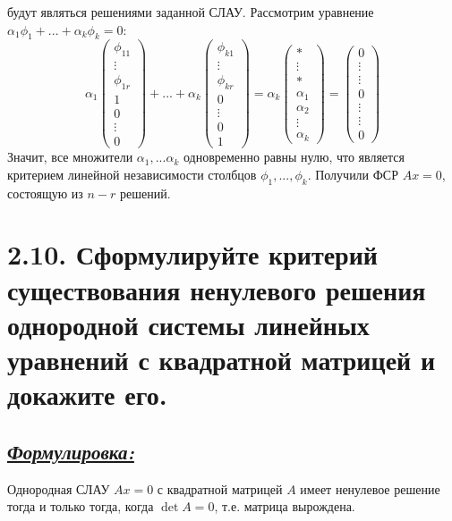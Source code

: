 \documentclass{article}
\begin{document}
будут являться решениями заданной СЛАУ. Рассмотрим уравнение $\alpha_1\phi_1 + ... + \alpha_{k}\phi_{k} = 0$:
$$
\alpha_1\begin{pmatrix}
\phi_{11} \\ \vdots \\ \phi_{1r} \\ 1 \\ 0 \\ \vdots \\ 0
\end{pmatrix}
+ ... + 
\alpha_{k}\begin{pmatrix}
\phi_{k1} \\ \vdots \\ \phi_{kr} \\  0 \\ \vdots \\ 0 \\ 1
\end{pmatrix}
=
\alpha_{k}\begin{pmatrix}
* \\ \vdots \\ * \\ \alpha_1 \\ \alpha_2 \\ \vdots \\ \alpha_k
\end{pmatrix}
= \begin{pmatrix}
0 \\ \vdots \\ \vdots \\ 0 \\ \vdots \\ \vdots \\ 0
\end{pmatrix}
$$
Значит, все множители $\alpha_1, ... \alpha_{k}$ одновременно равны нулю, что является критерием линейной независимости столбцов $\phi_1, ..., \phi_k$. Получили ФСР $Ax = 0$, состоящую из $n - r$ решений.

\section*{\LARGE 2.10. Сформулируйте критерий существования ненулевого решения однородной системы линейных уравнений с квадратной матрицей и докажите его. }
\subsection*{\Large \underline{\textit{Формулировка: }}}
Однородная СЛАУ $Ax = 0$ с квадратной матрицей $A$ имеет ненулевое решение тогда и только тогда, когда $\det{A} = 0$, т.е. матрица вырождена.
\end{document}
